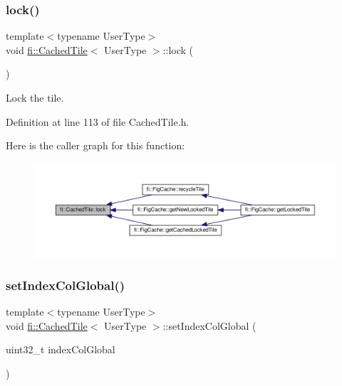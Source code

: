 \subsubsection{\texorpdfstring{lock()}{lock()}}
{\footnotesize\ttfamily template$<$typename User\+Type$>$ \\
void \hyperlink{classfi_1_1CachedTile}{fi\+::\+Cached\+Tile}$<$ User\+Type $>$\+::lock (\begin{DoxyParamCaption}{ }\end{DoxyParamCaption})\hspace{0.3cm}{\ttfamily [inline]}}



Lock the tile. 



Definition at line 113 of file Cached\+Tile.\+h.

Here is the caller graph for this function\+:
\nopagebreak
\begin{figure}[H]
\begin{center}
\leavevmode
\includegraphics[width=350pt]{d0/dbc/classfi_1_1CachedTile_a996218bd6a061692288167946515b93b_icgraph}
\end{center}
\end{figure}
\mbox{\label{classfi_1_1CachedTile_ad95876a2ad4b7bd2199c9645047d8e4c}} 
\subsubsection{\texorpdfstring{set\+Index\+Col\+Global()}{setIndexColGlobal()}}
{\footnotesize\ttfamily template$<$typename User\+Type$>$ \\
void \hyperlink{classfi_1_1CachedTile}{fi\+::\+Cached\+Tile}$<$ User\+Type $>$\+::set\+Index\+Col\+Global (\begin{DoxyParamCaption}\item[{uint32\+\_\+t}]{index\+Col\+Global }\end{DoxyParamCaption})\hspace{0.3cm}{\ttfamily [inline]}}



